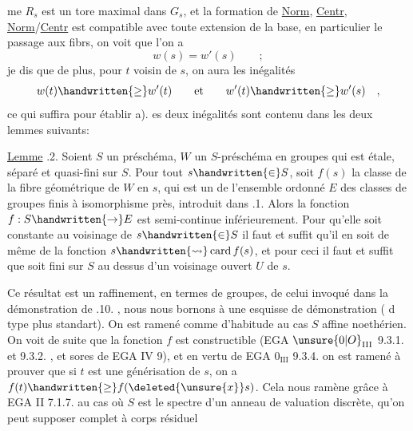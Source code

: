 me $R_s$ est un tore maximal dans $G_s$, et la formation de \uline{Norm}, \uline{Centr}, \uline{Norm}/\uline{Centr} est compatible avec toute extension de la base, en particulier le passage aux fibrs, on voit que l'on a
\[
w(s)=w'(s)\qquad ;
\]
je dis que de plus, pour $t$ voisin de $s$, on aura les inégalités
\[
w(t)\handwritten{\geq}w'(t)\qquad\text{et}\qquad w'(t)\handwritten{\geq}w'(s)\quad ,
\]
ce qui suffira pour établir a).  es deux inégalités  sont contenu dans les deux lemmes suivants:

\uline{Lemme} .2. Soient $S$ un préschéma, $W$ un $S$-préschéma en groupes qui est étale,  séparé et quasi-fini sur $S$. Pour tout $s\handwritten{\in}S$, soit $f(s)$ la classe de la fibre géométrique de $W$ en $s$, qui est un  de l'ensemble ordonné $E$ des classes de groupes finis à isomorphisme près, introduit dans .1. Alors la fonction $f:S\handwritten{\to}E$ est semi-continue inférieurement. Pour qu'elle soit constante au voisinage de $s\handwritten{\in}S$\handwritten{,}  il faut et suffit qu'il en soit de même de la fonction $s\handwritten{\rightsquigarrow}\operatorname{card}f(s)$, et pour ceci il faut et suffit que  soit fini sur $S$ au dessus d'un voisinage ouvert $U$ de $s$.

Ce résultat est un raffinement, en termes de groupes, de celui invoqué dans la démonstration de  .10. , nous nous bornons à une esquisse de  démonstration ( d type  plus standart). On est ramené comme d'habitude au cas $S$ affine noethérien. On voit de suite que la fonction $f$ est constructible (EGA  $\unsure{0|O}_{\mathrm{III}}$ 9.3.1. et 9.3.2. , et sores de EGA IV 9), et en vertu de EGA $0_{\mathrm{III}}$ 9.3.4. on est ramené  à prouver que si $t$ est une générisation de $s$, on a $f(t)\handwritten{\geq}f(\deleted{\unsure{x}}s)$. Cela nous ramène  grâce à EGA II 7.1.7. au cas où $S$ est le spectre d'un anneau de valuation discrète, qu'on peut supposer complet à corps résiduel
